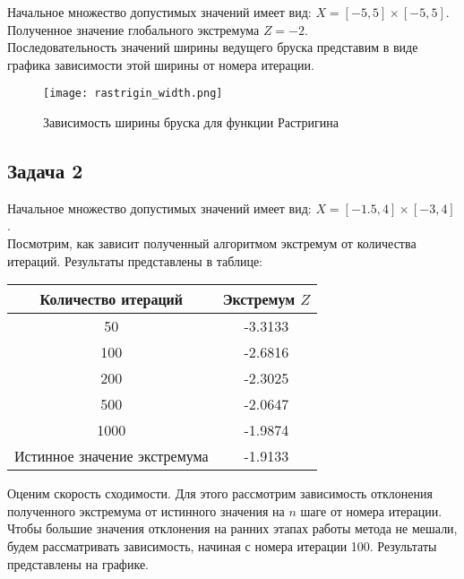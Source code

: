 Начальное множество допустимых значений имеет вид: $X = [-5, 5] \times [-5, 5]$. \\

Полученное значение глобального экстремума $Z=-2$. \\

Последовательность значений ширины ведущего бруска представим в виде графика зависимости этой ширины от номера итерации. \\

\newpage

\begin{figure}[h]
	\centering
	\texttt{[image: rastrigin\_width.png]}
	\caption{Зависимость ширины бруска для функции Растригина}
\end{figure}

\subsection{Задача 2}

Начальное множество допустимых значений имеет вид: $X = [-1.5, 4] \times [-3, 4]$. \\

Посмотрим, как зависит полученный алгоритмом экстремум от количества итераций. Результаты представлены в таблице:

\begin{center}
	\begin{tabular}{ |c|c| } 
		\hline
		Количество итераций & Экстремум $Z$ \\ 
		\hline
		50 & -3.3133 \\
		\hline
		100 & -2.6816 \\
		\hline
		200 & -2.3025 \\
		\hline
		500 & -2.0647 \\
		\hline
		1000 & -1.9874 \\
		\hline
		Истинное значение экстремума & -1.9133 \\
		\hline
	\end{tabular}
\end{center}

Оценим скорость сходимости. Для этого рассмотрим зависимость отклонения полученного экстремума от истинного значения на $n$ шаге от номера итерации. Чтобы большие значения отклонения на ранних этапах работы метода не мешали, будем рассматривать зависимость, начиная с номера итерации 100. Результаты представлены на графике.

\newpage

